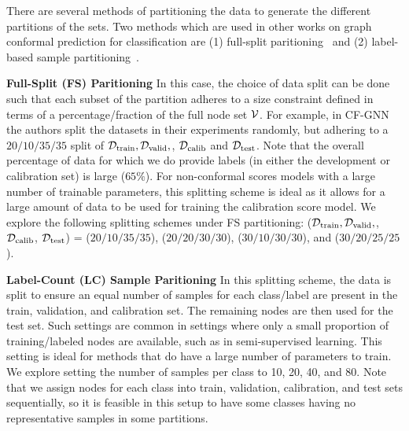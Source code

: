 There are several methods of partitioning the data to generate the different partitions of the sets. 
Two methods which are used in other works on graph conformal prediction for classification are (1) full-split paritioning~\cite{huang2024uncertainty} and (2) label-based sample partitioning~\cite{zargarbashi23conformal}.
 
\noindent \textbf{Full-Split (FS) Paritioning}
In this case, the choice of data split can be done such that each subset of the partition adheres to a size constraint defined in terms of a percentage/fraction of the full node set ${\mathcal{V}}$.
For example, in CF-GNN \cite{huang2024uncertainty} the authors split the datasets in their experiments randomly, but adhering to a $20/10/35/35$ split of ${\mathcal{D}}_{\text{train}}, {\mathcal{D}}_{\text{valid}},$, ${\mathcal{D}}_{\text{calib}}$ and  ${\mathcal{D}}_{\text{test}}$.
Note that the overall percentage of data for which we do provide labels (in either the development or calibration set) is large ($65\%$).
For non-conformal scores models with a large number of trainable parameters, this splitting scheme is ideal as it allows for a large amount of data to be used for training the calibration score  model.
We explore the following splitting schemes under FS partitioning:
(${\mathcal{D}}_{\text{train}}, {\mathcal{D}}_{\text{valid}},$, ${\mathcal{D}}_{\text{calib}}$, ${\mathcal{D}}_{\text{test}}$) = ($20/10/35/35$), ($20/20/30/30$), ($30/10/30/30$), and ($30/20/25/25$).

\noindent \textbf{Label-Count (LC) Sample Paritioning}
In this splitting scheme, the data is split to ensure an equal number of samples for each class/label are present in the train, validation, and calibration set.
The remaining nodes are then used for the test set.
Such settings are common in  settings where only a small proportion of training/labeled nodes are available, such as in semi-supervised learning.
This setting is ideal for methods that do have a large number of parameters to train.
We explore setting the number of samples per class to 10, 20, 40, and 80.
Note that we assign nodes for each class into train, validation, calibration, and test sets sequentially, so it is feasible in this setup to have some classes having no representative samples in some partitions. 